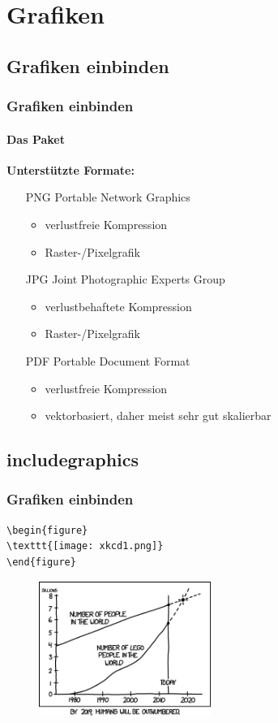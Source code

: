 \section{Grafiken}

\subsection{Grafiken einbinden}
\begin{frame}[fragile]
\frametitle{Grafiken einbinden}
\framesubtitle{Das Paket }
\textbf{Unterstützte Formate:}\smallskip
  \begin{itemize}
    \item[PNG] Portable Network Graphics
    \begin{itemize}
      \item verlustfreie Kompression
      \item Raster-/Pixelgrafik
    \end{itemize}
    \item[JPG] Joint Photographic Experts Group
    \begin{itemize}
      \item verlustbehaftete Kompression
      \item Raster-/Pixelgrafik
    \end{itemize}
    \item[PDF] Portable Document Format
    \begin{itemize}
      \item verlustfreie Kompression
      \item vektorbasiert, daher meist sehr gut skalierbar
    \end{itemize}
  \end{itemize}
\end{frame}

\subsection{includegraphics}
\begin{frame}[fragile]
\frametitle{Grafiken einbinden}
\begin{codeblock}
\begin{verbatim}
\begin{figure}
\texttt{[image: xkcd1.png]}
\end{figure}
\end{verbatim}
\end{codeblock}
\pause 
 \begin{figure}
      \includegraphics[width=0.5\textwidth]{images/xkcd1.png}
 \end{figure}
\end{frame}

